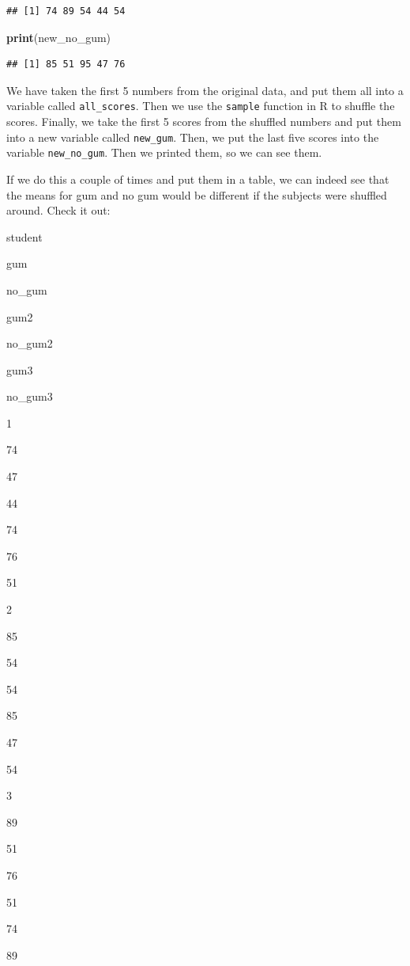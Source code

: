 \documentclass[]{book}
\newenvironment{Shaded}{\begin{snugshade}}{\end{snugshade}}
\newcommand{\KeywordTok}[1]{\textcolor[rgb]{0.13,0.29,0.53}{\textbf{#1}}}
\newcommand{\NormalTok}[1]{#1}
\begin{document}
\begin{verbatim}
## [1] 74 89 54 44 54
\end{verbatim}

\begin{Shaded}
\begin{Highlighting}[]
\KeywordTok{print}\NormalTok{(new_no_gum)}
\end{Highlighting}
\end{Shaded}

\begin{verbatim}
## [1] 85 51 95 47 76
\end{verbatim}

We have taken the first 5 numbers from the original data, and put them all into a variable called \texttt{all\_scores}. Then we use the \texttt{sample} function in R to shuffle the scores. Finally, we take the first 5 scores from the shuffled numbers and put them into a new variable called \texttt{new\_gum}. Then, we put the last five scores into the variable \texttt{new\_no\_gum}. Then we printed them, so we can see them.

If we do this a couple of times and put them in a table, we can indeed see that the means for gum and no gum would be different if the subjects were shuffled around. Check it out:

student

gum

no\_gum

gum2

no\_gum2

gum3

no\_gum3

1

74

47

44

74

76

51

2

85

54

54

85

47

54

3

89

51

76

51

74

89
\end{document}
